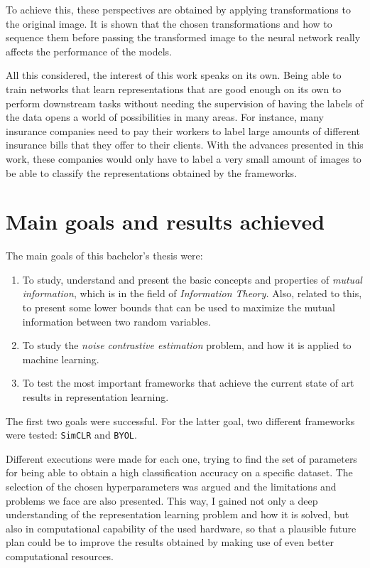 To achieve this, these perspectives are obtained by applying transformations to the original image. It is shown that the chosen transformations and how to sequence them before passing the transformed image to the neural network really affects the performance of the models.

All this considered, the interest of this work  speaks on its own. Being able to train networks that learn representations that are good enough on its own to perform downstream tasks without needing the supervision of having the labels of the data opens a world of possibilities in many areas. For instance, many insurance companies need to pay their workers to label large amounts of  different insurance bills that they offer to their clients. With the advances presented in this work, these companies would only have to label a very small amount of images to be able to classify the representations obtained by the frameworks.


\section*{Main goals and results achieved}

The main goals of this bachelor's thesis were:
\begin{enumerate}
\item To study, understand and present the basic concepts and properties of \emph{mutual information}, which is in the field of \emph{Information Theory.} Also, related to this, to present some lower bounds that can be used to maximize the mutual information between two random variables.
\item To study the \emph{noise contrastive estimation} problem, and how it is applied to machine learning.

\item To test the most important frameworks that achieve the current state of art results in representation learning. 
\end{enumerate}

The first two goals were successful. For the latter goal, two different frameworks were tested: \lstinline{SimCLR} and \lstinline{BYOL}. 

Different executions were made for each one, trying to find the set of parameters for being able to obtain a high classification accuracy on a specific dataset. The selection of the chosen hyperparameters was argued and the limitations and problems we face are also presented. This way, I gained not only a deep understanding of the representation learning problem and how it is solved, but also in computational capability of the used hardware, so that a plausible future plan could be to improve the results obtained by making use of even better computational resources.
